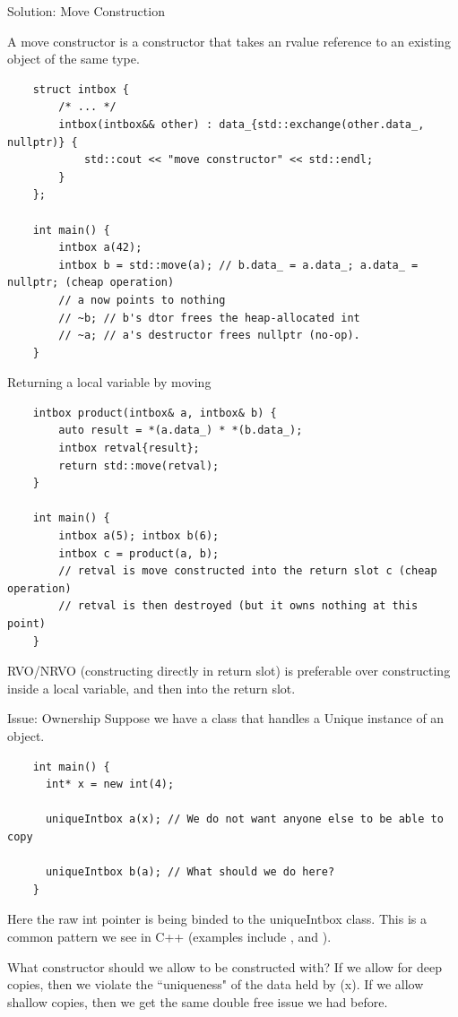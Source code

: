 \begin{frame}[fragile]{Solution: Move Construction}
  \begin{sqt:definition}
    A move constructor is a constructor that takes an rvalue reference
    to an existing object of the same type.
  \end{sqt:definition}

  \begin{verbatim}
    struct intbox {
        /* ... */
        intbox(intbox&& other) : data_{std::exchange(other.data_, nullptr)} {
            std::cout << "move constructor" << std::endl;
        }
    };

    int main() {
        intbox a(42);
        intbox b = std::move(a); // b.data_ = a.data_; a.data_ = nullptr; (cheap operation)
        // a now points to nothing
        // ~b; // b's dtor frees the heap-allocated int
        // ~a; // a's destructor frees nullptr (no-op).
    }
  \end{verbatim}
\end{frame}

\begin{frame}[fragile]{Returning a local variable by moving}
  \begin{verbatim}
    intbox product(intbox& a, intbox& b) {
        auto result = *(a.data_) * *(b.data_);
        intbox retval{result};
        return std::move(retval);
    }

    int main() {
        intbox a(5); intbox b(6);
        intbox c = product(a, b);
        // retval is move constructed into the return slot c (cheap operation)
        // retval is then destroyed (but it owns nothing at this point)
    }
  \end{verbatim}

  \begin{sqt:tip}
    RVO/NRVO (constructing directly in return slot)
    is preferable over constructing inside a local variable,
    and then  into the return slot.
  \end{sqt:tip}
\end{frame}

\begin{frame}[fragile]{Issue: Ownership}
  Suppose we have a class that handles a Unique instance of an object. 

  \begin{verbatim}
    int main() {
      int* x = new int(4);

      uniqueIntbox a(x); // We do not want anyone else to be able to copy

      uniqueIntbox b(a); // What should we do here?
    }
  \end{verbatim}

  Here the raw int pointer is being binded to the uniqueIntbox class. This is a common
  pattern we see in C++ (examples include , and ). 
  
  What constructor should we allow  to be constructed with? If we allow for deep copies,
  then we violate the ``uniqueness" of the data held by \code(x). If we allow shallow copies, then
  we get the same double free issue we had before. 
\end{frame}

